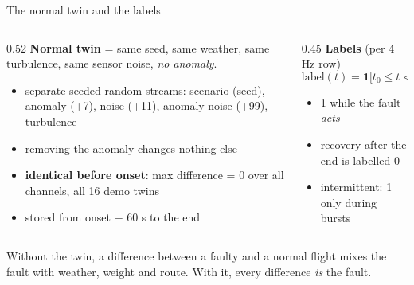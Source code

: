 \documentclass[aspectratio=169,11pt]{beamer}
\begin{document}
\begin{frame}{The normal twin and the labels}
  \begin{columns}[T]
    \begin{column}{0.52\textwidth}
      \small
      \textbf{Normal twin} = same seed, same weather, same turbulence, same sensor noise, \emph{no anomaly}.
      \begin{itemize}\footnotesize
        \item separate seeded random streams: scenario (seed), anomaly (+7), noise (+11), anomaly noise (+99), turbulence
        \item removing the anomaly changes nothing else
        \item \textbf{identical before onset}: max difference = 0 over all channels, all 16 demo twins
        \item stored from onset $-$ 60 s to the end
      \end{itemize}
    \end{column}
    \begin{column}{0.45\textwidth}
      \small
      \textbf{Labels} (per 4 Hz row)
      \[ \mathrm{label}(t) = \mathbf 1\big[t_0 \le t < t_{end}\big]\ (\wedge\ \text{in a burst}) \]
      \begin{itemize}\footnotesize
        \item 1 while the fault \emph{acts}
        \item recovery after the end is labelled 0
        \item intermittent: 1 only during bursts
      \end{itemize}
    \end{column}
  \end{columns}
  \vspace{0.8em}
  \begin{block}{}
    \small Without the twin, a difference between a faulty and a normal flight mixes the fault with weather, weight and route. With it, every difference \emph{is} the fault.
  \end{block}
\end{frame}
\end{document}
